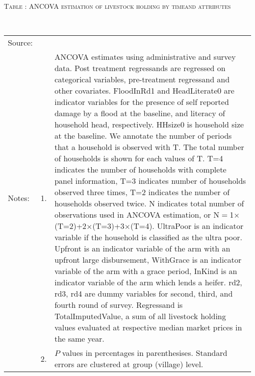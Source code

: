 \hspace{-1cm}\begin{minipage}[t]{14cm}
\hfil\textsc{\normalsize Table \thetable: ANCOVA estimation of livestock holding by timeand attributes\label{tab ANCOVA livestock holding time varying attributes}}\\
\setlength{\tabcolsep}{1pt}
\setlength{\baselineskip}{8pt}
\renewcommand{\arraystretch}{.55}
\hfil{}\\
\renewcommand{\arraystretch}{.8}
\setlength{\tabcolsep}{1pt}
\begin{tabular}{>{\hfill\scriptsize}p{1cm}<{}>{\hfill\scriptsize}p{.25cm}<{}>{\scriptsize}p{12cm}<{\hfill}}
Source:& \multicolumn{2}{l}{\scriptsize Estimated with GUK administrative and survey data.}\\
Notes: & 1. & ANCOVA estimates using administrative and survey data. Post treatment regressands are regressed on categorical variables, pre-treatment regressand and other covariates. \textsf{FloodInRd1} and \textsf{HeadLiterate0} are indicator variables for the presence of self reported damage by a flood at the baseline, and literacy of household head, respectively. \textsf{HHsize0} is household size at the baseline. We annotate the number of periods that a household is observed with \textsf{T}. The total number of households is shown for each values of \textsf{T}. \textsf{T=4} indicates the number of households with complete panel information, \textsf{T=3} indicates number of households observed three times, \textsf{T=2} indicates the number of households observed twice. \textsf{N} indicates total number of observations used in ANCOVA estimation, or \textsf{N$=$1$\times$(T=2)+2$\times$(T=3)+3$\times$(T=4)}.  \textsf{UltraPoor} is an indicator variable if the household is classified as the ultra poor. \textsf{Upfront} is an indicator variable of the arm with an upfront large disbursement, \textsf{WithGrace} is an indicator variable of the arm with a grace period, \textsf{InKind} is an indicator variable of the arm which lends a heifer. \textsf{rd2, rd3, rd4} are dummy variables for second, third, and fourth round of survey. Regressand is \textsf{TotalImputedValue}, a sum of all livestock holding values evaluated at respective median market prices in the same year. \\
& 2. & $P$ values in percentages in parenthesises. Standard errors are clustered at group (village) level.
\end{tabular}
\end{minipage}



